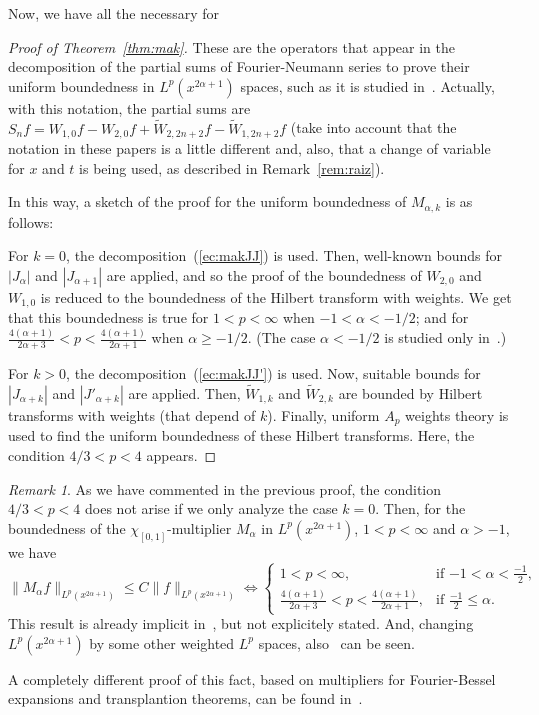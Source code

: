 \documentclass{amsart}
\theoremstyle{remark}
\newtheorem{rem}{Remark}
\newcommand{\ma}{M_{\alpha}}
\newcommand{\mak}{M_{\alpha,k}}
\newcommand{\lpnorm}[2]{\|{#1}\|_{L^{#2}(x^{2\alpha+1})}}
\begin{document}
Now, we have all the necessary for

\begin{proof}[Proof of Theorem~\ref{thm:mak}]

These are the operators that appear in the decomposition of the partial sums
of Fourier-Neumann series to prove their uniform boundedness in
$L^p(x^{2\alpha+1})$ spaces, such as it is studied
in~\cite{Var,GPV-Con,CGPV-FN}. Actually, with this notation, the partial sums
are
$S_nf = W_{1,0}f - W_{2,0}f + \widetilde W_{2,2n+2}f - \widetilde
W_{1,2n+2}f$ (take into account that the notation in these papers is a little
different and, also, that a change of variable for $x$ and $t$ is being used,
as described in Remark~\ref{rem:raiz}).

In this way, a sketch of the proof for the uniform boundedness of $\mak$ is as
follows:

For $k=0$, the decomposition~(\ref{ec:makJJ}) is used. Then, well-known bounds
for $|J_{\alpha}|$ and $|J_{\alpha+1}|$ are applied, and so the proof of the
boundedness of $W_{2,0}$ and $W_{1,0}$ is reduced to the boundedness of the
Hilbert transform with weights. We get that this boundedness is true for
$1 < p < \infty$ when $-1 < \alpha < -1/2$; and for
$\frac{4(\alpha+1)}{2\alpha+3} < p < \frac{4(\alpha+1)}{2\alpha+1}$ when
$\alpha \ge -1/2$. (The case $\alpha<-1/2$ is studied only
in~\cite{GPV-Con}.)

For $k>0$, the decomposition~(\ref{ec:makJJ'}) is used. Now, suitable bounds
for $|J_{\alpha+k}|$ and $|J'_{\alpha+k}|$ are applied. Then,
$\widetilde W_{1,k}$ and $\widetilde W_{2,k}$ are bounded by Hilbert transforms
with weights (that depend of $k$). Finally, uniform $A_p$ weights theory is
used to find the uniform boundedness of these Hilbert transforms.
Here, the condition $4/3 < p < 4$ appears.
\end{proof}


\begin{rem}
As we have commented in the previous proof, the condition $4/3 < p < 4$ does 
not arise if we only analyze the case $k=0$. Then, for the boundedness of
the $\chi_{[0,1]}$-multiplier $\ma$ in $L^p(x^{2\alpha+1})$, $1<p<\infty$ and
$\alpha>-1$, we have
\begin{equation*}
    \lpnorm{\ma f}{p} \le C \lpnorm{f}{p}
    \iff
    \begin{cases}
    1 < p < \infty, &\text{if \ $-1 < \alpha < \frac{-1}2$,} \\
    \frac{4(\alpha+1)}{2\alpha+3} < p 
      < \frac{4(\alpha+1)}{2\alpha+1}, &\text{if \ $\frac{-1}2 \le \alpha$.}
    \end{cases}
\end{equation*}
This result is already implicit in~\cite{GPV-Con}, but not explicitely
stated. And, changing $L^p(x^{2\alpha+1})$ by some other weighted $L^p$ spaces,
also~\cite{Var-Evora} can be seen.

A completely different proof of this fact, based on multipliers for
Fourier-Bessel expansions and transplantion theorems, can be found
in~\cite{BeStem}.
\end{rem}
\end{document}
